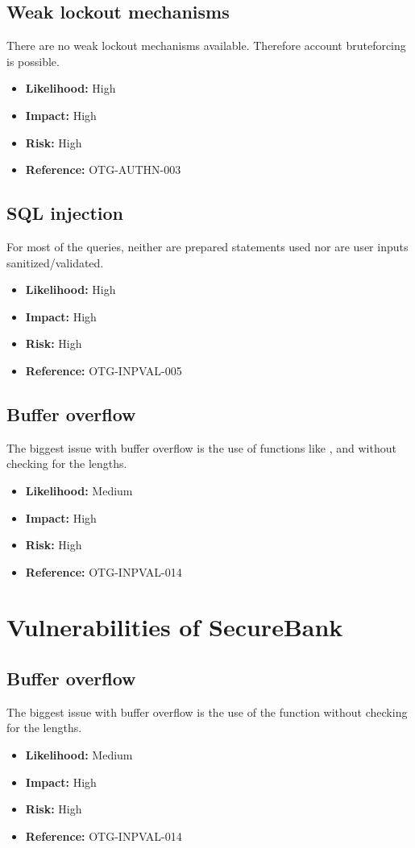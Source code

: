 \subsection{Weak lockout mechanisms}
There are no weak lockout mechanisms available. Therefore account bruteforcing is possible.
\begin{itemize}
	\item \textbf{Likelihood:} High
	\item \textbf{Impact:} High
	\item \textbf{Risk:} High
	\item \textbf{Reference:} OTG-AUTHN-003
\end{itemize}

\subsection{SQL injection}
For most of the queries, neither are prepared statements used nor are user inputs sanitized/validated.
\begin{itemize}
	\item \textbf{Likelihood:} High
	\item \textbf{Impact:} High
	\item \textbf{Risk:} High
	\item \textbf{Reference:} OTG-INPVAL-005
\end{itemize}

\subsection{Buffer overflow}
The biggest issue with buffer overflow is the use of functions like ,  and  without checking for the lengths.
\begin{itemize}
	\item \textbf{Likelihood:} Medium
	\item \textbf{Impact:} High
	\item \textbf{Risk:} High
	\item \textbf{Reference:} OTG-INPVAL-014
\end{itemize}

\section{Vulnerabilities of SecureBank}

\subsection{Buffer overflow}
The biggest issue with buffer overflow is the use of the function  without checking for the lengths.
\begin{itemize}
	\item \textbf{Likelihood:} Medium
	\item \textbf{Impact:} High
	\item \textbf{Risk:} High
	\item \textbf{Reference:} OTG-INPVAL-014
\end{itemize}

